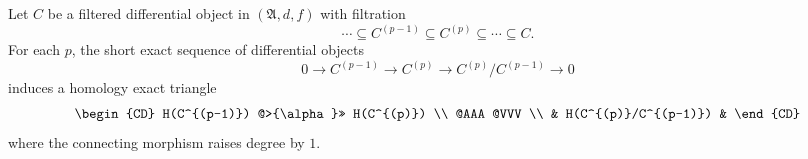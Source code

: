 Let $C$ be a filtered differential object in $(\mathfrak{A}, d, f)$ with filtration
$$
\cdots \subseteq C^{(p-1)} \subseteq C^{(p)} \subseteq \cdots \subseteq C.
$$
For each $p$, the short exact sequence of differential objects
$$
0 \to C^{(p-1)} \to C^{(p)} \to C^{(p)}/C^{(p-1)} \to 0
$$
induces a homology exact triangle
$$
\begin{CD}
H(C^{(p-1)}) @>{\alpha}>> H(C^{(p)}) \\
@AAA @VVV \\
& H(C^{(p)}/C^{(p-1)}) &
\end{CD}
$$
where the connecting morphism raises degree by $1$.

